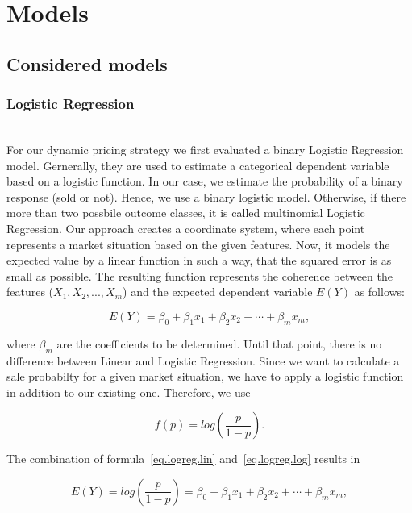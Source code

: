 \section{Models}
\subsection{Considered models}
\subsubsection{Logistic Regression}
    ~\\
    For our dynamic pricing strategy we first evaluated a binary Logistic Regression model. Gernerally, they are used to estimate a categorical dependent variable based on a logistic function. In our case, we estimate the probability of a binary response (sold or not). Hence, we use a binary logistic model. Otherwise, if there more than two possbile outcome classes, it is called multinomial Logistic Regression.
    Our approach creates a coordinate system, where each point represents a market situation based on the given features. Now, it models the expected value by a linear function in such a way, that the squared error is as small as possible. The resulting function represents the coherence between the features ($X_1, X_2, ..., X_m$) and the expected dependent variable $E(Y)$ as follows:

    \begin{equation}
    \label{eq.logreg.lin}
    E(Y) = \beta _{0}+\beta _{1}x_{1}+\beta _{2}x_{2}+\cdots +\beta _{m}x_{m},
    \end{equation}

    where $\beta _m$ are the coefficients to be determined. Until that point, there is no difference between Linear and Logistic Regression. Since we want to calculate a sale probabilty for a given market situation, we have to apply a logistic function in addition to our existing one. Therefore, we use

    \begin{equation}
    \label{eq.logreg.log}
    f(p)=log\left(\frac{p}{1-p}\right).
    \end{equation}

    The combination of formula~\ref{eq.logreg.lin} and~\ref{eq.logreg.log} results in

    \begin{equation}
    \label{eq.logreg.loglin}
    E(Y) = log\left(\frac{p}{1-p}\right) = \beta _{0}+\beta _{1}x_{1}+\beta _{2}x_{2}+\cdots +\beta _{m}x_{m},
    \end{equation}

